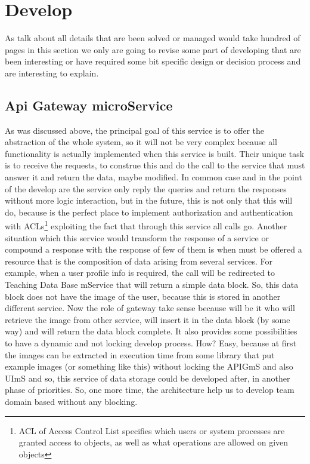 \chapter{Develop}

As talk about all details that are been solved or managed would take hundred of
pages in this section we only are going to revise some part of developing that
are been interesting or have required some bit specific design or decision process
and are interesting to explain.

\section{Api Gateway microService}

As was discussed above, the principal goal of this service is to offer the
abstraction of the whole system, so it will not be very complex because all
functionality is actually implemented when this service is built.
\intro
Their unique task is to receive the requests, to construe this and do the call
to the service that must answer it and return the data,
maybe modified.
In common case and in the point of the develop are the service only
reply the queries and return the responses without more logic interaction, but
in the future, this is not only that this will do, because is the perfect place
to implement authorization and authentication with ACLs\footnote{ACL of Access Control List
specifies which users or system processes are granted access to objects, as well
as what operations are allowed on given objects} exploiting the fact that through
this service all calls go.
\intro
Another situation which this service would transform the response of a service or
compound a response with the response of few of them is when must be offered a
resource that is the composition of data arising from several services. For example,
when a user profile info is required, the call will be redirected to Teaching Data
Base mService that will return a simple data block. So, this data block does not
have the image of the user, because this is stored in another different service.
Now the role of gateway take sense because will be it who will retrieve the image
from other service, will insert it in the data block (by some way) and will return
the data block complete.
\intro
It also provides some possibilities to have a dynamic and not locking develop process.
How? Easy, because at first the images can be extracted in execution time from some
library that put example images (or something like this) without locking the APIGmS
and also UImS and so, this service of data storage could be developed after, in another
phase of priorities. So, one more time, the architecture help us to develop team domain
based without any blocking.


